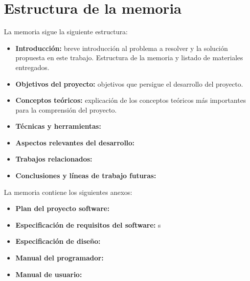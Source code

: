 \section{Estructura de la memoria}\label{estructura-de-la-memoria}

La memoria sigue la siguiente estructura:

\begin{itemize}
\tightlist
\item
  \textbf{Introducción:} breve introducción al problema a resolver y la
  solución propuesta en este trabajo. Estructura de la memoria y listado de materiales
  entregados.
\item
  \textbf{Objetivos del proyecto:} objetivos que
  persigue el desarrollo del proyecto.
\item
  \textbf{Conceptos teóricos:} explicación de los conceptos
  teóricos más importantes para la comprensión del proyecto.
\item
  \textbf{Técnicas y herramientas:} 
\item
  \textbf{Aspectos relevantes del desarrollo:} 
\item
  \textbf{Trabajos relacionados:} 
\item
  \textbf{Conclusiones y líneas de trabajo futuras:} 
\end{itemize}

La memoria contiene los siguientes anexos:

\begin{itemize}
\tightlist
\item
  \textbf{Plan del proyecto software:} 
\item
  \textbf{Especificación de requisitos del software:} s
\item
  \textbf{Especificación de diseño:} 
\item
  \textbf{Manual del programador:} 
\item
  \textbf{Manual de usuario:} 
\end{itemize}





